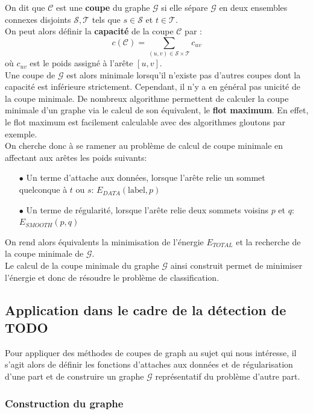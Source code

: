 \documentclass{article}
\newcommand{\G}{\mathcal{G}}
\newcommand{\lab}{\text{label}}
\begin{document}
On dit que $\mathcal{C}$ est une \textbf{coupe} du graphe $\G$ si elle sépare $\G$ en deux ensembles connexes disjoints $\mathcal{S},\mathcal{T}$ tels que  
$s \in \mathcal{S}$ et $t \in \mathcal{T}$.\\
On peut alors définir la \textbf{capacité} de la coupe $\mathcal{C}$ par :
\[
	c(\mathcal{C}) = \sum_{(u,v) \in \mathcal{S} \times \mathcal{T}} c_{uv}
\]
où $c_{uv}$ est le poids assigné à l'arête $[u,v]$.\\
Une coupe de $\G$ est alors minimale lorsqu'il n'existe pas d'autres coupes dont la capacité est inférieure strictement. Cependant, il n'y a en général pas unicité de la coupe minimale. De nombreux algorithme permettent de calculer la coupe minimale d'un graphe via le calcul de son équivalent, le \textbf{flot maximum}. En effet, le flot maximum est facilement calculable avec des algorithmes gloutons par exemple. \\
On cherche donc à se ramener au problème de calcul de coupe minimale en affectant aux arêtes les poids suivants:
\begin{itemize}
	\item[$\bullet$] Un terme d'attache aux données, lorsque l'arête relie un sommet quelconque à $t$ ou $s$: $E_{DATA}(\lab, p)$
	\item[$\bullet$] Un terme de régularité, lorsque l'arête relie deux sommets voisins $p$ et $q$: $E_{SMOOTH}(p,q)$
\end{itemize}
On rend alors équivalents la minimisation de l'énergie $E_{TOTAL}$ et la recherche de la coupe minimale de $\G$.\\
Le calcul de la coupe minimale du graphe $\G$ ainsi construit permet de minimiser l'énergie et donc de résoudre le problème de classification.

\subsection{Application dans le cadre de la détection de TODO}

Pour appliquer des méthodes de coupes de graph au sujet qui nous intéresse, il s'agit alors de définir les fonctions d'attaches aux données et de régularisation d'une part et de construire un graphe $\G$ représentatif du problème d'autre part.

\subsubsection{Construction du graphe}
\end{document}
